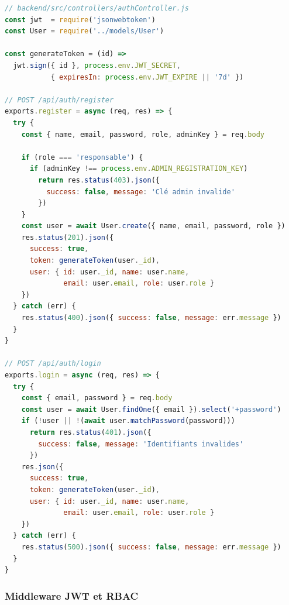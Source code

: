 \begin{lstlisting}[language=JavaScript, caption={Contrôleur d'authentification -- inscription et connexion}, label={lst:auth_ctrl}]
// backend/src/controllers/authController.js
const jwt  = require('jsonwebtoken')
const User = require('../models/User')

const generateToken = (id) =>
  jwt.sign({ id }, process.env.JWT_SECRET,
           { expiresIn: process.env.JWT_EXPIRE || '7d' })

// POST /api/auth/register
exports.register = async (req, res) => {
  try {
    const { name, email, password, role, adminKey } = req.body

    if (role === 'responsable') {
      if (adminKey !== process.env.ADMIN_REGISTRATION_KEY)
        return res.status(403).json({
          success: false, message: 'Clé admin invalide'
        })
    }
    const user = await User.create({ name, email, password, role })
    res.status(201).json({
      success: true,
      token: generateToken(user._id),
      user: { id: user._id, name: user.name,
              email: user.email, role: user.role }
    })
  } catch (err) {
    res.status(400).json({ success: false, message: err.message })
  }
}

// POST /api/auth/login
exports.login = async (req, res) => {
  try {
    const { email, password } = req.body
    const user = await User.findOne({ email }).select('+password')
    if (!user || !(await user.matchPassword(password)))
      return res.status(401).json({
        success: false, message: 'Identifiants invalides'
      })
    res.json({
      success: true,
      token: generateToken(user._id),
      user: { id: user._id, name: user.name,
              email: user.email, role: user.role }
    })
  } catch (err) {
    res.status(500).json({ success: false, message: err.message })
  }
}
\end{lstlisting}

\subsubsection{Middleware JWT et RBAC}

